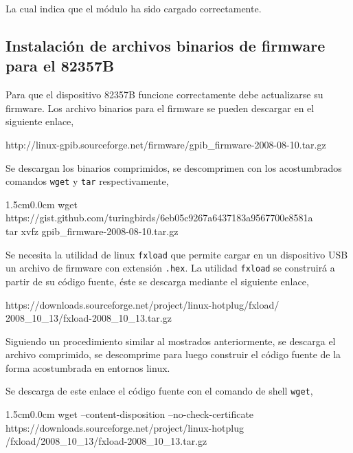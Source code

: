 \documentclass[paper=letter,oneside,fontsize=11pt, parskip=full]{scrartcl}
\newenvironment{code}
	{\begin{adjustwidth}{1.5cm}{0.0cm}\ttfamily}
	{\end{adjustwidth}}
\newenvironment{link}
	{\ttfamily}{}
\begin{document}
		La cual indica que el módulo ha sido cargado correctamente.
		
		\subsection{Instalación de archivos binarios de firmware para el 82357B}	
		
		Para que el dispositivo 82357B funcione correctamente debe actualizarse su firmware. Los archivo binarios para el firmware se pueden descargar en el siguiente enlace, 
		
		\begin{link}
			http://linux-gpib.sourceforge.net/firmware/gpib\_firmware-2008-08-10.tar.gz
		\end{link}
	
		Se descargan los binarios comprimidos, se descomprimen con los acostumbrados comandos \texttt{wget} y \texttt{tar} respectivamente,
		
		\begin{code}
			wget https://gist.github.com/turingbirds/6eb05c9267a6437183a9567700e8581a \\ 		
			tar xvfz gpib\_firmware-2008-08-10.tar.gz 
		\end{code}
		
		Se necesita la utilidad de linux \texttt{fxload} que permite cargar en un dispositivo USB un archivo de firmware con extensión \texttt{.hex}. La utilidad \texttt{fxload} se construirá a partir de su código fuente, éste se descarga mediante el siguiente enlace,
		
		\begin{link}		
			https://downloads.sourceforge.net/project/linux-hotplug/fxload/ \\ 2008\_10\_13/fxload-2008\_10\_13.tar.gz		
		\end{link}
		
 		Siguiendo un procedimiento similar al mostrados anteriormente, se descarga el archivo comprimido, se descomprime para luego construir el código fuente de la forma acostumbrada en entornos linux. 
		
		Se descarga de este enlace el código fuente con el comando de shell \texttt{wget},
		
		\begin{code}			
			wget --content-disposition --no-check-certificate \\ https://downloads.sourceforge.net/project/linux-hotplug \\ /fxload/2008\_10\_13/fxload-2008\_10\_13.tar.gz
		\end{code}
		
\end{document}
